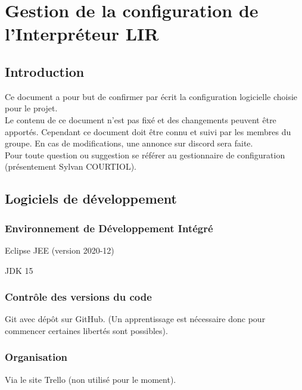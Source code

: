     \newpage

    \setcounter{section}{0}
    \renewcommand{\thesection}{\arabic{section}}
    \renewcommand{\thesubsection}{\arabic{section}.\arabic{subsection}}

    \chapter{Gestion de la configuration de l'Interpréteur LIR}

    \section*{Introduction}
    Ce document a pour but de confirmer par écrit la configuration logicielle choisie pour le projet.
    \\ Le contenu de ce document n’est pas fixé et des changements peuvent être
    apportés. Cependant ce document doit être connu et suivi par les membres du groupe.
    En cas de modifications, une annonce sur discord sera faite.
    \\ Pour toute question ou suggestion se référer au gestionnaire de configuration
    (présentement
    Sylvan COURTIOL).


    \normalsize
    \section{Logiciels de développement}
        \subsection{Environnement de Développement Intégré}
        Eclipse JEE (version 2020-12)
        \par JDK 15

        \subsection{Contrôle des versions du code}
        Git avec dépôt sur GitHub. (Un apprentissage est nécessaire
        donc pour commencer certaines libertés sont possibles).

        \subsection{Organisation}
        Via le site Trello (non utilisé pour le moment).

